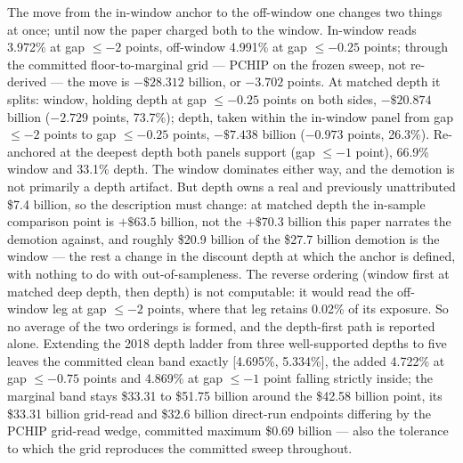 The move from the in-window anchor to the off-window one changes two things at once; until now the paper charged both to the window. In-window reads 3.972\% at gap $\leq -2$ points, off-window 4.991\% at gap $\leq -0.25$ points; through the committed floor-to-marginal grid --- PCHIP on the frozen sweep, not re-derived --- the move is $-\$28.312$ billion, or $-3.702$ points. At matched depth it splits: window, holding depth at gap $\leq -0.25$ points on both sides, $-\$20.874$ billion ($-2.729$ points, 73.7\%); depth, taken within the in-window panel from gap $\leq -2$ points to gap $\leq -0.25$ points, $-\$7.438$ billion ($-0.973$ points, 26.3\%). Re-anchored at the deepest depth both panels support (gap $\leq -1$ point), 66.9\% window and 33.1\% depth. The window dominates either way, and the demotion is not primarily a depth artifact. But depth owns a real and previously unattributed \$7.4 billion, so the description must change: at matched depth the in-sample comparison point is $+\$63.5$ billion, not the $+\$70.3$ billion this paper narrates the demotion against, and roughly \$20.9 billion of the \$27.7 billion demotion is the window --- the rest a change in the discount depth at which the anchor is defined, with nothing to do with out-of-sampleness. The reverse ordering (window first at matched deep depth, then depth) is not computable: it would read the off-window leg at gap $\leq -2$ points, where that leg retains 0.02\% of its exposure. So no average of the two orderings is formed, and the depth-first path is reported alone. Extending the 2018 depth ladder from three well-supported depths to five leaves the committed clean band exactly [4.695\%, 5.334\%], the added 4.722\% at gap $\leq -0.75$ points and 4.869\% at gap $\leq -1$ point falling strictly inside; the marginal band stays \$33.31 to \$51.75 billion around the \$42.58 billion point, its \$33.31 billion grid-read and \$32.6 billion direct-run endpoints differing by the PCHIP grid-read wedge, committed maximum \$0.69 billion --- also the tolerance to which the grid reproduces the committed sweep throughout.

